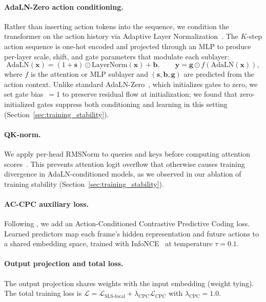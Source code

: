 \documentclass{article}
\begin{document}
\paragraph{AdaLN-Zero action conditioning.}
\label{sec:adaln}
Rather than inserting action tokens into the sequence, we condition the transformer on the action history via Adaptive Layer Normalization~\citep{peebles2023dit, perez2018film}.
The $K$-step action sequence is one-hot encoded and projected through an MLP to produce per-layer scale, shift, and gate parameters that modulate each sublayer:
\begin{equation}
  \text{AdaLN}(\mathbf{x}) = (1 + \mathbf{s}) \odot \text{LayerNorm}(\mathbf{x}) + \mathbf{b}, \qquad
  \mathbf{y} = \mathbf{g} \odot f(\text{AdaLN}(\mathbf{x})),
  \label{eq:adaln}
\end{equation}
where $f$ is the attention or MLP sublayer and $(\mathbf{s}, \mathbf{b}, \mathbf{g})$ are predicted from the action context.
Unlike standard AdaLN-Zero~\citep{peebles2023dit}, which initializes gates to zero, we set gate bias~$= 1$ to preserve residual flow at initialization; we found that zero-initialized gates suppress both conditioning and learning in this setting (Section~\ref{sec:training_stability}).

\paragraph{QK-norm.}
We apply per-head RMSNorm to queries and keys before computing attention scores~\citep{esser2024sd3}.
This prevents attention logit overflow that otherwise causes training divergence in AdaLN-conditioned models, as we observed in our ablation of training stability (Section~\ref{sec:training_stability}).

\paragraph{AC-CPC auxiliary loss.}
Following \citet{burchi2025twister}, we add an Action-Conditioned Contrastive Predictive Coding loss.
Learned predictors map each frame's hidden representation and future actions to a shared embedding space, trained with InfoNCE~\citep{oord2018cpc} at temperature $\tau = 0.1$.

\paragraph{Output projection and total loss.}
The output projection shares weights with the input embedding (weight tying).
The total training loss is $\mathcal{L} = \mathcal{L}_\text{SLS-focal} + \lambda_\text{CPC} \mathcal{L}_\text{CPC}$ with $\lambda_\text{CPC} = 1.0$.
\end{document}
